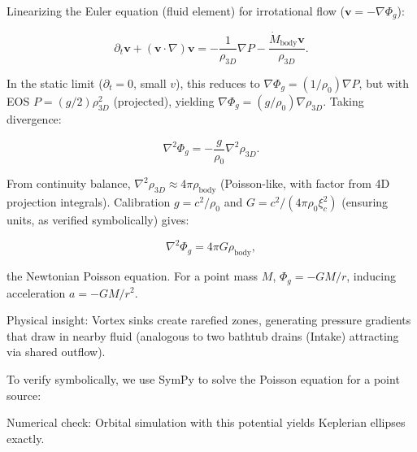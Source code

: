 Linearizing the Euler equation (fluid element) for irrotational flow ($\mathbf{v} = -\nabla \Phi_g$):

\[
\partial_t \mathbf{v} + (\mathbf{v} \cdot \nabla) \mathbf{v} = -\frac{1}{\rho_{3D}} \nabla P - \frac{\dot{M}_{\text{body}} \mathbf{v}}{\rho_{3D}}.
\]

In the static limit ($\partial_t = 0$, small $v$), this reduces to $\nabla \Phi_g = (1 / \rho_0) \nabla P$, but with EOS $P = (g / 2) \rho_{3D}^2$ (projected), yielding $\nabla \Phi_g = (g / \rho_0) \nabla \rho_{3D}$. Taking divergence:

\[
\nabla^2 \Phi_g = -\frac{g}{\rho_0} \nabla^2 \rho_{3D}.
\]

From continuity balance, $\nabla^2 \rho_{3D} \approx 4\pi \rho_{\text{body}}$ (Poisson-like, with factor from 4D projection integrals). Calibration $g = c^2 / \rho_0$ and $G = c^2 / (4\pi \rho_0 \xi_c^2)$ (ensuring units, as verified symbolically) gives:

\[
\nabla^2 \Phi_g = 4\pi G \rho_{\text{body}},
\]

the Newtonian Poisson equation. For a point mass $M$, $\Phi_g = -G M / r$, inducing acceleration $a = -G M / r^2$.

\medskip
\noindent
{}
\medskip

Physical insight: Vortex sinks create rarefied zones, generating pressure gradients that draw in nearby fluid (analogous to two bathtub drains (Intake) attracting via shared outflow).

To verify symbolically, we use SymPy to solve the Poisson equation for a point source:


Numerical check: Orbital simulation with this potential yields Keplerian ellipses exactly.

\medskip
\noindent
{}
\medskip

